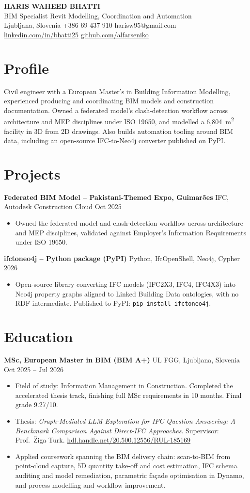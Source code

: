 \documentclass[a4paper,10.5pt]{article}
\newcommand{\datefill}{\dotfill}
\newcommand{\entry}[3]{\vspace{2.5pt}\noindent\textbf{#1} \textbar{} #2 \datefill{} #3\par\vspace{0.5pt}}
\newcommand{\ROLELINE}{BIM Specialist \textbar{} Revit Modelling, Coordination and Automation}
\newcommand{\projIfcToNeo}{%
\entry{ifctoneo4j -- Python package (PyPI)}{Python, IfcOpenShell, Neo4j, Cypher}{2026}
\begin{itemize}
  \item Open-source library converting IFC models (IFC2X3, IFC4, IFC4X3) into Neo4j
        property graphs aligned to Linked Building Data ontologies, with no RDF
        intermediate. Published to PyPI: \texttt{pip install ifctoneo4j}.
\end{itemize}}
\newcommand{\projGuimaraes}{%
\entry{Federated BIM Model -- Pakistani-Themed Expo, Guimar\~aes}{IFC, Autodesk Construction Cloud}{Oct 2025}
\begin{itemize}
  \item Owned the federated model and clash-detection workflow across architecture
        and MEP disciplines, validated against Employer's Information Requirements
        under ISO 19650.
\end{itemize}}
\begin{document}
\begin{center}
  {\LARGE\bfseries HARIS WAHEED BHATTI}\\[2pt]
  {\large \ROLELINE}\\[3pt]
  Ljubljana, Slovenia \textbar{} +386 69 437 910 \textbar{} harisw95@gmail.com\\
  \href{https://linkedin.com/in/bhatti25}{linkedin.com/in/bhatti25} \textbar{}
  \href{https://github.com/alfarseniko}{github.com/alfarseniko}
\end{center}
\vspace{-4pt}

\section{Profile}

\noindent Civil engineer with a European Master's in Building Information Modelling,
experienced producing and coordinating BIM models and construction documentation.
Owned a federated model's clash-detection workflow across architecture and MEP
disciplines under ISO 19650, and modelled a 6,804~m\textsuperscript{2} facility in 3D
from 2D drawings. Also builds automation tooling around BIM data, including an
open-source IFC-to-Neo4j converter published on PyPI.

\section{Projects}

 \projGuimaraes \projIfcToNeo

\section{Education}
\entry{MSc, European Master in BIM (BIM A+)}{UL FGG, Ljubljana, Slovenia}{Oct 2025 -- Jul 2026}
\begin{itemize}
  \item Field of study: Information Management in Construction. Completed the
        accelerated thesis track, finishing full MSc requirements in 10 months.
        Final grade 9.27/10.
  \item Thesis: \textit{Graph-Mediated LLM Exploration for IFC Question Answering:
        A Benchmark Comparison Against Direct-IFC Approaches}. Supervisor:
        Prof.~\v{Z}iga Turk. \href{http://hdl.handle.net/20.500.12556/RUL-185169}{hdl.handle.net/20.500.12556/RUL-185169}
  \item Applied coursework spanning the BIM delivery chain: scan-to-BIM from point-cloud capture, 5D quantity take-off and cost estimation, IFC schema auditing and model remediation, parametric façade optimisation in Dynamo, and process modelling and workflow improvement.
\end{itemize}
\end{document}
